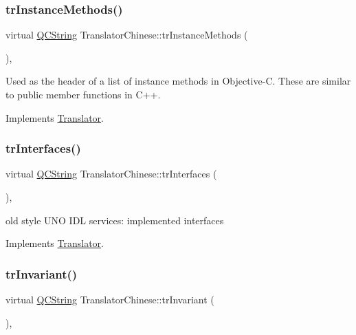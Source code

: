 \subsubsection{\texorpdfstring{trInstanceMethods()}{trInstanceMethods()}}
{\footnotesize\ttfamily virtual \mbox{\hyperlink{class_q_c_string}{Q\+C\+String}} Translator\+Chinese\+::tr\+Instance\+Methods (\begin{DoxyParamCaption}{ }\end{DoxyParamCaption})\hspace{0.3cm}{\ttfamily [inline]}, {\ttfamily [virtual]}}

Used as the header of a list of instance methods in Objective-\/C. These are similar to public member functions in C++. 

Implements \mbox{\hyperlink{class_translator}{Translator}}.

\mbox{\label{class_translator_chinese_ae406583bd351cfadaa6f9249e25a0fd4}} 
\subsubsection{\texorpdfstring{trInterfaces()}{trInterfaces()}}
{\footnotesize\ttfamily virtual \mbox{\hyperlink{class_q_c_string}{Q\+C\+String}} Translator\+Chinese\+::tr\+Interfaces (\begin{DoxyParamCaption}{ }\end{DoxyParamCaption})\hspace{0.3cm}{\ttfamily [inline]}, {\ttfamily [virtual]}}

old style U\+NO I\+DL services\+: implemented interfaces 

Implements \mbox{\hyperlink{class_translator}{Translator}}.

\mbox{\label{class_translator_chinese_adce8fc7f636074b243f47c76f4e6b37b}} 
\subsubsection{\texorpdfstring{trInvariant()}{trInvariant()}}
{\footnotesize\ttfamily virtual \mbox{\hyperlink{class_q_c_string}{Q\+C\+String}} Translator\+Chinese\+::tr\+Invariant (\begin{DoxyParamCaption}{ }\end{DoxyParamCaption})\hspace{0.3cm}{\ttfamily [inline]}, {\ttfamily [virtual]}}

